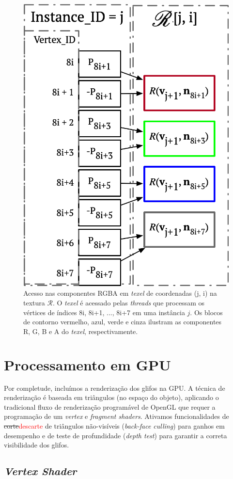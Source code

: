 \begin{figure}[ht]
    \centering
    \includegraphics[width=.45\linewidth, angle=0]{figs/Esquema_Glifo/texel_lookup_6.png}
    \caption{Acesso nas componentes RGBA em \textit{texel} de coordenadas (j, i) na textura $\mathscr{R}$. O \textit{texel} é acessado pelas \textit{threads} que processam os vértices de índices 8i, 8i+1, ..., 8i+7 em uma instância $j$. Os blocos de contorno vermelho, azul, verde e cinza ilustram as componentes R, G, B e A do \textit{texel}, respectivamente.}
    \label{fig::texelfetch}
\end{figure}
\section{Processamento em GPU}
\label{sec::processamento_GPU}

Por completude, incluímos a renderização dos glifos na GPU. A técnica de renderização é baseada em triângulos (no espaço do objeto), aplicando o tradicional fluxo de renderização programável de OpenGL que requer a programação de um \textit{vertex} e \textit{fragment shaders}. Ativamos funcionalidades de \sout{corte}\textcolor{red}{descarte} de triângulos não-visíveis (\textit{back-face culling}) para ganhos em desempenho e de teste de profundidade (\textit{depth test}) para garantir a correta visibilidade dos glifos.


\subsection{\textit{Vertex Shader}}
\label{ssec::vertex_shader}

